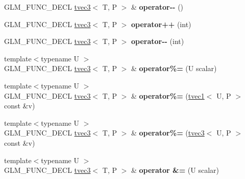 \begin{DoxyCompactItemize}
G\+L\+M\+\_\+\+F\+U\+N\+C\+\_\+\+D\+E\+CL \hyperlink{structglm_1_1tvec3}{tvec3}$<$ T, P $>$ \& {\bfseries operator-\/-\/} ()
\item 
\mbox{\label{structglm_1_1tvec3_ab316ac7b6ea57d038e304dc43b9f3490}} 
G\+L\+M\+\_\+\+F\+U\+N\+C\+\_\+\+D\+E\+CL \hyperlink{structglm_1_1tvec3}{tvec3}$<$ T, P $>$ {\bfseries operator++} (int)
\item 
\mbox{\label{structglm_1_1tvec3_abc0a890711331ebd0769c133824572bc}} 
G\+L\+M\+\_\+\+F\+U\+N\+C\+\_\+\+D\+E\+CL \hyperlink{structglm_1_1tvec3}{tvec3}$<$ T, P $>$ {\bfseries operator-\/-\/} (int)
\item 
\mbox{\label{structglm_1_1tvec3_a627465a3f104107ba25349a842e8aa61}} 
{\footnotesize template$<$typename U $>$ }\\G\+L\+M\+\_\+\+F\+U\+N\+C\+\_\+\+D\+E\+CL \hyperlink{structglm_1_1tvec3}{tvec3}$<$ T, P $>$ \& {\bfseries operator\%=} (U scalar)
\item 
\mbox{\label{structglm_1_1tvec3_a4bad68930d445ca78624dee131d95e15}} 
{\footnotesize template$<$typename U $>$ }\\G\+L\+M\+\_\+\+F\+U\+N\+C\+\_\+\+D\+E\+CL \hyperlink{structglm_1_1tvec3}{tvec3}$<$ T, P $>$ \& {\bfseries operator\%=} (\hyperlink{structglm_1_1tvec1}{tvec1}$<$ U, P $>$ const \&v)
\item 
\mbox{\label{structglm_1_1tvec3_abb9bf8c109aa14bc40356f31eba946b0}} 
{\footnotesize template$<$typename U $>$ }\\G\+L\+M\+\_\+\+F\+U\+N\+C\+\_\+\+D\+E\+CL \hyperlink{structglm_1_1tvec3}{tvec3}$<$ T, P $>$ \& {\bfseries operator\%=} (\hyperlink{structglm_1_1tvec3}{tvec3}$<$ U, P $>$ const \&v)
\item 
\mbox{\label{structglm_1_1tvec3_aa80b6398aa55a93d85a9f4d3104bcaef}} 
{\footnotesize template$<$typename U $>$ }\\G\+L\+M\+\_\+\+F\+U\+N\+C\+\_\+\+D\+E\+CL \hyperlink{structglm_1_1tvec3}{tvec3}$<$ T, P $>$ \& {\bfseries operator \&=} (U scalar)
\item 
\mbox{\label{structglm_1_1tvec3_a90de8358b9c8247ab33411d4b2452524}} 

\end{DoxyCompactItemize}
